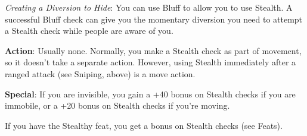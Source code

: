 \textit{Creating a Diversion to Hide}: You can use Bluff to allow you to use Stealth. A successful Bluff check can give you the momentary diversion you need to attempt a Stealth check while people are aware of you.
				
\textbf{Action}: Usually none. Normally, you make a Stealth check as part of movement, so it doesn't take a separate action. However, using Stealth immediately after a ranged attack (see Sniping, above) is a move action.
				
\textbf{Special}: If you are invisible, you gain a +40 bonus on Stealth checks if you are immobile, or a +20 bonus on Stealth checks if you're moving.
				
If you have the Stealthy feat, you get a bonus on Stealth checks (see Feats).
        	

